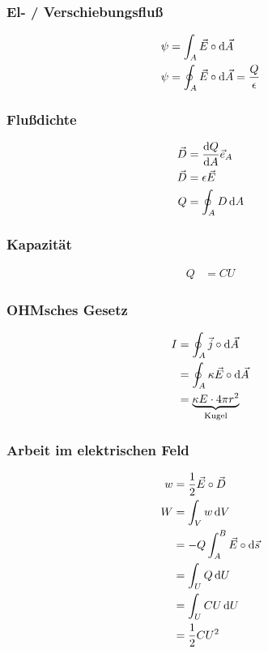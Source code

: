 \newpage
\begin{multicols}{2}{}
\subsubsection*{El- / Verschiebungsfluß}
\begin{align*}
\psi&=\int_A\vec{E}\circ\mathop{}\!\mathrm{d}\vec{A}\\
\psi&=\oint_A\vec{E}\circ\mathop{}\!\mathrm{d}\vec{A}=\frac{Q}{\epsilon}\\
\end{align*}

\subsubsection*{Flußdichte}
\begin{align*}
\vec{D}&=\frac{\mathop{}\!\mathrm{d} Q}{\mathop{}\!\mathrm{d} A}\vec{e}_A\\
\vec{D}&=\epsilon\vec{E}\\
Q&=\oint_AD\mathop{}\!\mathrm{d} A
\end{align*}
\end{multicols}

\subsubsection*{Kapazität}
\begin{align*}
Q&=CU
\end{align*}

\begin{multicols}{2}{}
\subsubsection*{OHMsches Gesetz}
\begin{align*}
I &=\oint_A\vec{j}\circ\mathop{}\!\mathrm{d}\vec{A}\\
  &=\oint_A \kappa\vec{E}\circ\mathop{}\!\mathrm{d}\vec{A}\\
  &=\underbrace{\kappa E\cdot 4\pi r^2}_{\text{Kugel}}
\end{align*}
\vspace{20mm}

\subsubsection*{Arbeit im elektrischen Feld}
\begin{align*}
w&=\frac{1}{2}\vec{E}\circ\vec{D}\\
W&=\int_Vw\mathop{}\!\mathrm{d} V\\
 &=-Q\int_A^B\vec{E}\circ\mathop{}\!\mathrm{d}\vec{s}\\
 &=\int_U Q\mathop{}\!\mathrm{d} U\\
 &= \int_U CU \mathop{}\!\mathrm{d} U\\
 &=\frac{1}{2}CU^2
\end{align*}
\end{multicols}
